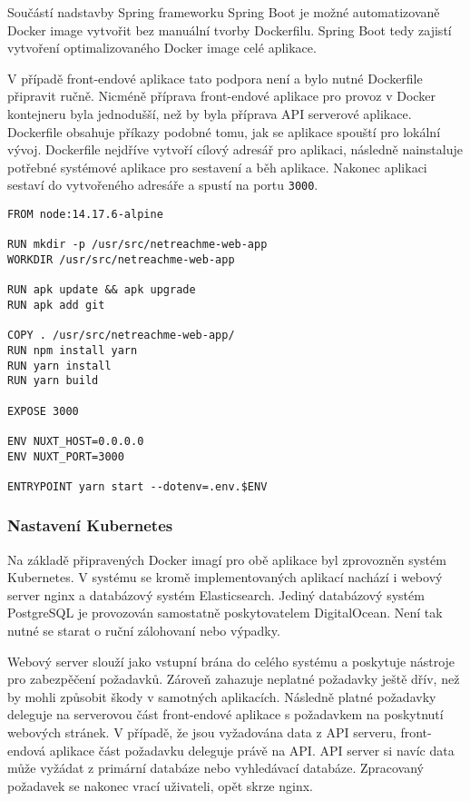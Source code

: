 		Součástí nadstavby Spring frameworku Spring Boot je možné automatizovaně Docker image vytvořit bez manuální tvorby
		Dockerfilu.
		Spring Boot tedy zajistí vytvoření optimalizovaného Docker image celé aplikace.

		V případě front-endové aplikace tato podpora není a bylo nutné Dockerfile připravit ručně.
		Nicméně příprava front-endové aplikace pro provoz v Docker kontejneru byla jednodušší, než by byla příprava \ac{API}
		serverové aplikace.
		Dockerfile obsahuje příkazy podobné tomu, jak se aplikace spouští pro lokální vývoj.
		Dockerfile nejdříve vytvoří cílový adresář pro aplikaci, následně nainstaluje potřebné systémové aplikace pro sestavení
		a běh aplikace.
		Nakonec aplikaci sestaví do vytvořeného adresáře a spustí na portu \lstinline{3000}.

		\begin{lstlisting}[caption={Dockerfile spouštějící front-endovou aplikaci v Dockeru. Zdroj: [autor]}]
FROM node:14.17.6-alpine

RUN mkdir -p /usr/src/netreachme-web-app
WORKDIR /usr/src/netreachme-web-app

RUN apk update && apk upgrade
RUN apk add git

COPY . /usr/src/netreachme-web-app/
RUN npm install yarn
RUN yarn install
RUN yarn build

EXPOSE 3000

ENV NUXT_HOST=0.0.0.0
ENV NUXT_PORT=3000

ENTRYPOINT yarn start --dotenv=.env.$ENV
		\end{lstlisting}

		\subsubsection{Nastavení Kubernetes}

		Na základě připravených Docker imagí pro obě aplikace byl zprovozněn systém Kubernetes.
		V systému se kromě implementovaných aplikací nachází i webový server nginx a databázový systém Elasticsearch.
		Jediný databázový systém PostgreSQL je provozován samostatně poskytovatelem DigitalOcean.
		Není tak nutné se starat o ruční zálohovaní nebo výpadky.


		Webový server slouží jako vstupní brána do celého systému a poskytuje nástroje pro zabezpěčení požadavků.
		Zároveň zahazuje neplatné požadavky ještě dřív, než by mohli způsobit škody v samotných aplikacích.
		Následně platné požadavky deleguje na serverovou část front-endové aplikace s požadavkem na poskytnutí webových stránek.
		V případě, že jsou vyžadována data z API serveru, front-endová aplikace část požadavku deleguje právě na \ac{API}.
		\ac{API} server si navíc data může vyžádat z primární databáze nebo vyhledávací databáze.
		Zpracovaný požadavek se nakonec vrací uživateli, opět skrze nginx.

